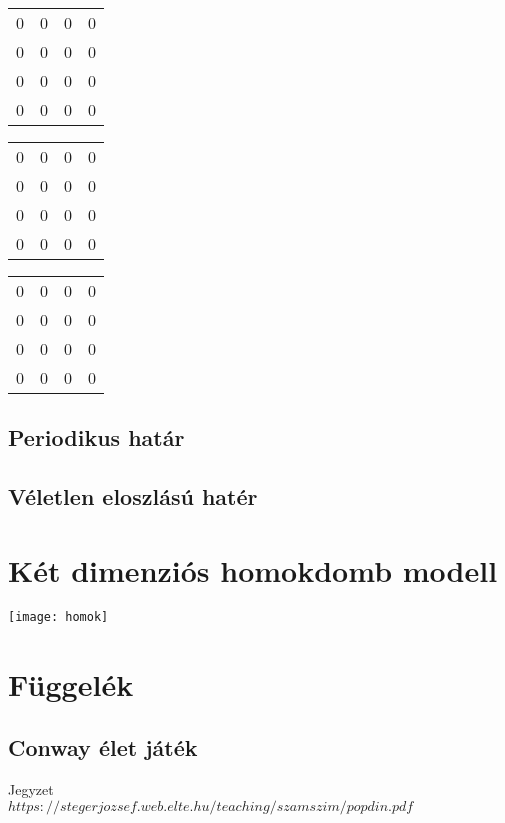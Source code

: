\documentclass[paper=a4, fontsize=11pt]{article}
\begin{document}
\quad
\begin{tabular}{cccc}
0&0&0&0\\
0&0&0&0\\
0&0&0&0\\
0&0&0&0
\end{tabular}
\quad
\begin{tabular}{cccc}
0&0&0&0\\
0&0&0&0\\
0&0&0&0\\
0&0&0&0
\end{tabular}
\quad
\begin{tabular}{cccc}
0&0&0&0\\
0&0&0&0\\
0&0&0&0\\
0&0&0&0
\end{tabular}



\subsection{Periodikus határ}








\subsection{Véletlen eloszlású hatér}












\section{Két dimenziós homokdomb modell}


\texttt{[image: homok]}





\newpage
\section{Függelék}
\subsection{Conway élet játék}



\begin{thebibliography}{}

 
Jegyzet
\\\texttt{$https://stegerjozsef.web.elte.hu/teaching/szamszim/popdin.pdf$}
 

\end{thebibliography}
\end{document}
